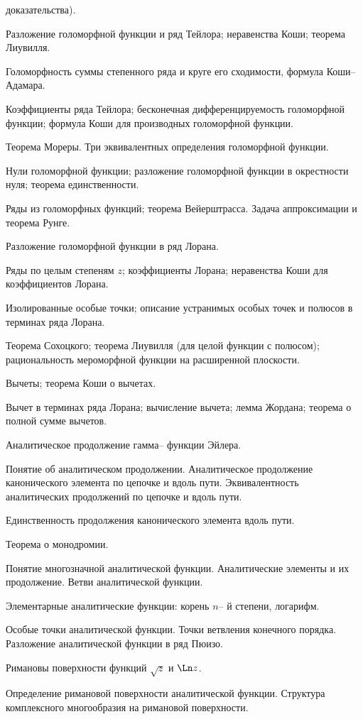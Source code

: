 \documentclass[a4paper]{article}
\begin{document}
\begin{nums}{-3}
доказательства).
\item Разложение голоморфной функции и ряд Тейлора; неравенства Коши; теорема
Лиувилля.
\item Голоморфность суммы степенного ряда и круге его сходимости, формула
Коши-- Адамара.
\item Коэффициенты ряда Тейлора; бесконечная дифференцируемость голоморфной
функции; формула Коши для производных голоморфной функции.
\item Теорема Мореры. Три эквивалентных определения голоморфной функции.
\item Нули голоморфной функции; разложение голоморфной функции в окрестности
нуля; теорема единственности.
\item Ряды из голоморфных функций; теорема Вейерштрасса. Задача аппроксимации
и теорема Рунге.
\item Разложение голоморфной функции в ряд Лорана.
\item Ряды по целым степеням $z$; коэффициенты Лорана; неравенства Коши для
коэффициентов Лорана.
\item Изолированные особые точки; описание устранимых особых точек и полюсов в
терминах ряда Лорана.
\item Теорема Сохоцкого; теорема Лиувилля (для целой функции с полюсом);
рациональность мероморфной функции на расширенной плоскости.
\item Вычеты; теорема Коши о вычетах.
\item Вычет в терминах ряда Лорана; вычисление вычета; лемма Жордана; теорема
о полной сумме вычетов.
\item Аналитическое продолжение гамма-- функции Эйлера.
\item Понятие об аналитическом продолжении. Аналитическое продолжение
канонического элемента по цепочке и вдоль пути. Эквивалентность
аналитических продолжений по цепочке и вдоль пути.
\item Единственность продолжения канонического элемента вдоль пути.
\item Теорема о монодромии.
\item Понятие многозначной аналитической функции. Аналитические элементы и их
продолжение. Ветви аналитической функции.
\item Элементарные аналитические функции: корень $n$-- й степени, логарифм.
\item Особые точки аналитической функции. Точки ветвления конечного порядка.
Разложение аналитической функции в ряд Пюизо.
\item Римановы поверхности функций $\sqrt z$ и $\Ln z$.
\item Определение римановой поверхности аналитической функции. Структура
комплексного многообразия на римановой поверхности.
\end{nums}
\end{document}
